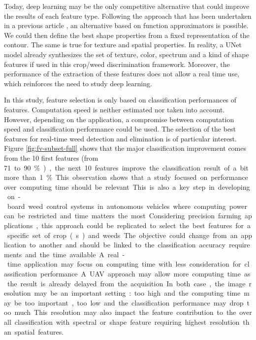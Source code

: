\documentclass[../thesis.tex]{subfiles}
\begin{document}
    Today, deep learning may be the only competitive alternative that could improve the results of each feature type. Following the approach that has been undertaken in a previous article \cite{Vayssade2021}, an alternative based on function approximators is possible. We could then define the best shape properties from a fixed representation of the contour. The same is true for texture and spatial properties. In reality, a UNet model already synthesizes the set of texture, color, spectrum and a kind of shape features if used in this crop/weed discrimination framework. Moreover, the performance of the extraction of these features does not allow a real time use, which reinforces the need to study deep learning.
    
    In this study, feature selection is only based on classification performances of features. Computation speed is neither estimated nor taken into account. However, depending on the application, a compromise between computation speed and classification performance could be used. The selection of the best features for real-time weed detection and elimination is of particular interest. Figure \ref{fig:fv-subset-full} shows that the major classification improvement comes from the 10 first features (from \SI{71} to \SI{90}{\percent}), the next 10 features improve the classification result of a bit more than \SI{1}{\percent}. This observation shows that a study focused on performance over computing time should be relevant. This is also a key step in developing on-board weed control systems in autonomous vehicles where computing power can be restricted and time matters the most. 
    
    Considering precision farming applications, this approach could be replicated to select the best features for a specific set of crop(s) and weeds. The objective could change from an application to another and should be linked to the classification accuracy requirements and the time available. A real-time application may focus on computing time with less consideration for classification performance. A UAV approach may allow more computing time as the result is already delayed from the acquisition. In both case, the image resolution may be an important setting: too high and the computing time may be too important, too low and the classification performance may drop too much. This resolution may also impact the feature contribution to the overall classification with spectral or shape feature requiring highest resolution than spatial features.
    
    
    
\end{document}
